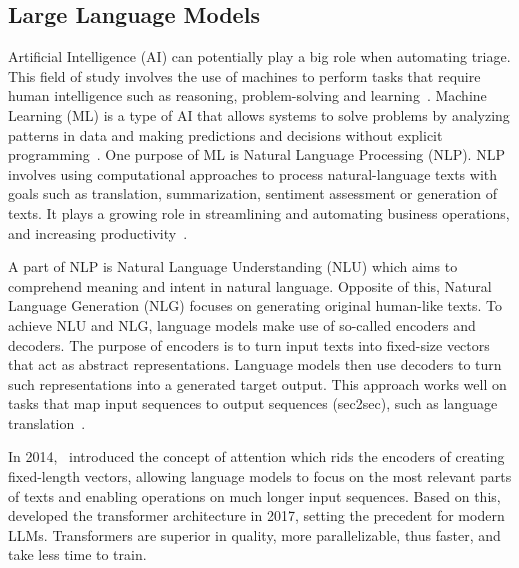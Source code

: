 \subsection{Large Language Models}
\label{subsec:intro-definitions}

Artificial Intelligence (AI) can potentially play a big role when automating triage.
This field of study involves the use of machines to perform tasks that require human intelligence such as reasoning,
problem-solving and learning\ \citep{oed:ai}.
Machine Learning (ML) is a type of AI that allows systems to solve problems by analyzing patterns in data and making
predictions and decisions without explicit programming\ \citep{oed:ml}.
One purpose of ML is Natural Language Processing (NLP).
NLP involves using computational approaches to process natural-language texts with goals such as translation,
summarization, sentiment assessment or generation of texts.
It plays a growing role in streamlining and automating business operations, and increasing
productivity\ \citep{ibm:siem}.

A part of NLP is Natural Language Understanding (NLU) which aims to comprehend meaning and intent in natural language.
Opposite of this, Natural Language Generation (NLG) focuses on generating original human-like texts.
To achieve NLU and NLG, language models make use of so-called encoders and decoders.
The purpose of encoders is to turn input texts into fixed-size vectors that act as abstract representations.
Language models then use decoders to turn such representations into a generated target output.
This approach works well on tasks that map input sequences to output sequences (sec2sec), such as language
translation\ \citep{sutskever2014sequence, cho2014learning}.

In 2014,\ \citet{bahdanau2014neural} introduced the concept of attention which rids the encoders of creating
fixed-length vectors, allowing language models to focus on the most relevant parts of texts and enabling operations on
much longer input sequences.
Based on this,\ \citet{vaswani2017attention} developed the transformer architecture in 2017, setting the precedent for
modern LLMs.
Transformers are superior in quality, more parallelizable, thus faster, and take less time to train.

